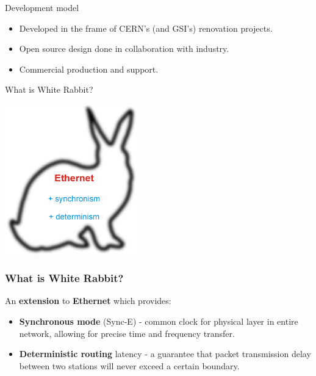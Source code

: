 \documentclass[compress,red]{beamer}
\begin{document}

\begin{frame}{Development model}
\begin{itemize}
\item Developed in the frame of CERN's (and GSI's) renovation projects.
\item Open source design done in collaboration with industry.
\item Commercial production and support.
\end{itemize}
\end{frame}

\begin{frame}{What is White Rabbit?}
\begin{center}
\includegraphics[height=6.5cm]{misc/rabbit.pdf}
\end{center}
\end{frame}

\frame
{
  \frametitle{What is White Rabbit?}

\begin{block}{}
  An \textbf{extension} to \textbf{Ethernet} which provides:
  \begin{itemize}
  \item \textbf{Synchronous mode} (Sync-E) - common clock for physical layer in entire network, allowing for precise time and frequency transfer.

\item \textbf{Deterministic routing} latency - a guarantee that packet transmission delay between two stations will never exceed a certain boundary.
\end{itemize}
\end{block}

}
\end{document}
